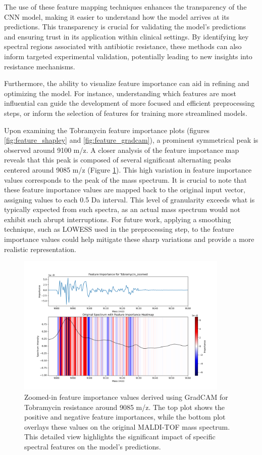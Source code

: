 \documentclass[english,11pt,a4paper,titlepage]{article}
\begin{document}
The use of these feature mapping techniques enhances the transparency of the CNN model, making it easier to understand how the model arrives at its predictions. This transparency is crucial for validating the model's predictions and ensuring trust in its application within clinical settings. By identifying key spectral regions associated with antibiotic resistance, these methods can also inform targeted experimental validation, potentially leading to new insights into resistance mechanisms.

Furthermore, the ability to visualize feature importance can aid in refining and optimizing the model. For instance, understanding which features are most influential can guide the development of more focused and efficient preprocessing steps, or inform the selection of features for training more streamlined models.

Upon examining the Tobramycin feature importance plots (figures \ref{fig:feature_shapley} and \ref{fig:feature_gradcam}), a prominent symmetrical peak is observed around 9100 m/z. A closer analysis of the feature importance map reveals that this peak is composed of several significant alternating peaks centered around 9085 m/z (Figure \ref{fig:tobramycin_zoomed}). This high variation in feature importance values corresponds to the peak of the mass spectrum. It is crucial to note that these feature importance values are mapped back to the original input vector, assigning values to each 0.5 Da interval. This level of granularity exceeds what is typically expected from such spectra, as an actual mass spectrum would not exhibit such abrupt interruptions. For future work, applying a smoothing technique, such as LOWESS used in the preprocessing step, to the feature importance values could help mitigate these sharp variations and provide a more realistic representation.

\begin{figure}[h]
	\centering
	\includegraphics[width=0.9\textwidth]{img/Tobramycin_zoomed.png}
	\caption{Zoomed-in feature importance values derived using GradCAM for Tobramycin resistance around 9085 m/z. The top plot shows the positive and negative feature importances, while the bottom plot overlays these values on the original MALDI-TOF mass spectrum. This detailed view highlights the significant impact of specific spectral features on the model's predictions.}
	\label{fig:tobramycin_zoomed}
\end{figure}
\end{document}
